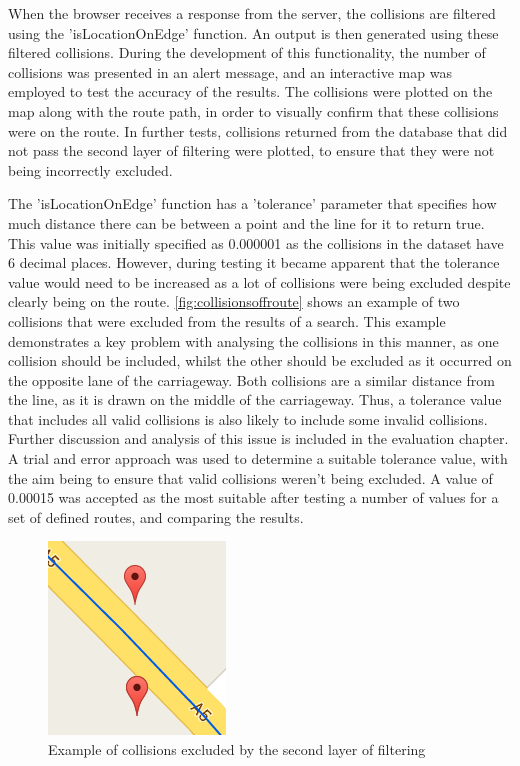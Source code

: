 \documentclass[authoryearcitations]{UoYCSproject}
\begin{document}
When the browser receives a response from the server, the collisions are filtered using the 'isLocationOnEdge' function. An output is then generated using these filtered collisions. During the development of this functionality, the number of collisions was presented in an alert message, and an interactive map was employed to test the accuracy of the results. The collisions were plotted on the map along with the route path, in order to visually confirm that these collisions were on the route. In further tests, collisions returned from the database that did not pass the second layer of filtering were plotted, to ensure that they were not being incorrectly excluded. 

The 'isLocationOnEdge' function has a 'tolerance' parameter that specifies how much distance there can be between a point and the line for it to return true. This value was initially specified as 0.000001 as the collisions in the dataset have 6 decimal places. However, during testing it became apparent that the tolerance value would need to be increased as a lot of collisions were being excluded despite clearly being on the route. \autoref{fig:collisionsoffroute} shows an example of two collisions that were excluded from the results of a search. This example demonstrates a key problem with analysing the collisions in this manner, as one collision should be included, whilst the other should be excluded as it occurred on the opposite lane of the carriageway. Both collisions are a similar distance from the line, as it is drawn on the middle of the carriageway. Thus, a tolerance value that includes all valid collisions is also likely to include some invalid collisions. Further discussion and analysis of this issue is included in the evaluation chapter. A trial and error approach was used to determine a suitable tolerance value, with the aim being to ensure that valid collisions weren't being excluded. A value of 0.00015 was accepted as the most suitable after testing a number of values for a set of defined routes, and comparing the results.

\begin{figure}
	\center
	\includegraphics[scale=0.8]{collisionoffroute}
	\caption{Example of collisions excluded by the second layer of filtering}
	\label{fig:collisionsoffroute}
\end{figure}
\end{document}
